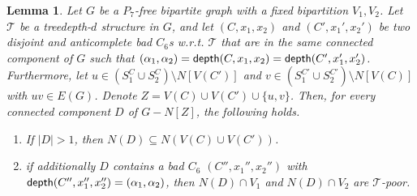 \documentclass[11pt,a4paper]{article}
\newtheorem{lemma}[theorem]{Lemma}
\theoremstyle{definition}
\def\T{\mathcal{T}}
\begin{document}
\begin{lemma}\label{lem:bip-doubleC6}
Let $G$ be a $P_7$-free bipartite graph with a fixed bipartition $V_1,V_2$.
Let $\T$ be a treedepth-$d$ structure in $G$, and
let $(C,x_1,x_2)$ and $(C',x_1',x_2')$ be two disjoint and anticomplete bad $C_6$s w.r.t. $\T$
that are in the same connected component of $G$
such that $(\alpha_1,\alpha_2) = \mathsf{depth}(C,x_1,x_2) = \mathsf{depth}(C',x_1',x_2')$.
Furthermore, let $u \in (S_1^C \cup S_2^C) \setminus N[V(C')]$ and
$v \in (S_1^{C'} \cup S_2^{C'}) \setminus N[V(C)]$ with $uv \in E(G)$. 
Denote $Z = V(C) \cup V(C') \cup \{u,v\}$. 
Then, for every connected component $D$ of $G-N[Z]$, the following holds.
\begin{enumerate}
    \item If $|D| > 1$, then $N(D) \subseteq N(V(C) \cup V(C'))$.
    \item if additionally $D$  contains a bad $C_6$ $(C'',x_1'',x_2'')$
       with $\mathsf{depth}(C'',x_1'',x_2'') = (\alpha_1,\alpha_2)$,
       then $N(D) \cap V_1$ and $N(D) \cap V_2$ are $\T$-poor. 
    \end{enumerate}
\end{lemma}
\end{document}
